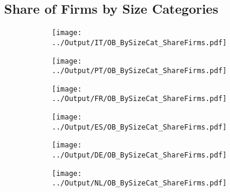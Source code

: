 \documentclass[12pt,notitlepage]{article}
\begin{document}
\subsection{Share of Firms by Size Categories}
\begin{figure}[!htpb]
\centering
\begin{subfigure}{.49\textwidth}
    \centering
 \texttt{[image: ../Output/IT/OB\_BySizeCat\_ShareFirms.pdf]}
\end{subfigure}%
\begin{subfigure}{.49\textwidth}
    \centering
 \texttt{[image: ../Output/PT/OB\_BySizeCat\_ShareFirms.pdf]}
\end{subfigure}
\begin{subfigure}{.49\textwidth}
    \centering
 \texttt{[image: ../Output/FR/OB\_BySizeCat\_ShareFirms.pdf]}
\end{subfigure}%
\begin{subfigure}{.49\textwidth}
    \centering
 \texttt{[image: ../Output/ES/OB\_BySizeCat\_ShareFirms.pdf]}
\end{subfigure}
\begin{subfigure}{.49\textwidth}
    \centering
 \texttt{[image: ../Output/DE/OB\_BySizeCat\_ShareFirms.pdf]}
\end{subfigure}
\begin{subfigure}{.49\textwidth}
    \centering
 \texttt{[image: ../Output/NL/OB\_BySizeCat\_ShareFirms.pdf]}
\end{subfigure}
\end{figure}
\clearpage
\end{document}
